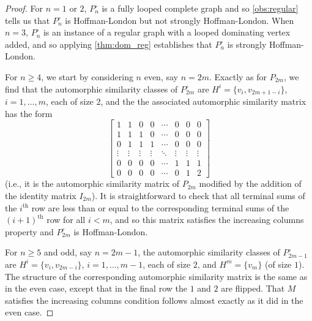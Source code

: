 \documentclass[11pt]{article}
\theoremstyle{definition}
\newcommand{\ith}[1]{$#1^{\text{th}}$}
\renewcommand{\loop}{\circ}
\begin{document}
\begin{proof}
For $n = 1$ or $2$, $P_n^\loop$ is a fully looped complete graph and so \cref{obs:regular} tells us that $P_n^\loop$ is Hoffman-London but not strongly Hoffman-London. When $n=3$, $P_n^\loop$ is an instance of a regular graph with a looped dominating vertex added, and so applying \cref{thm:dom_reg} establishes that $P_n^\loop$ is strongly Hoffman-London.

For $n \ge 4$, we start by considering $n$ even, say $n=2m$. Exactly as for $P_{2m}$, we find that the automorphic similarity classes of $P_{2m}^\circ$ are $H^i=\{v_i,v_{2m+1-i}\}$, $i=1, \ldots, m$, each of size $2$, and the the associated automorphic similarity matrix has the form 
\[ \begin{bmatrix}
1 & 1 & 0 & 0 & \cdots & 0 & 0 & 0\\
1 & 1 & 1 & 0 & \cdots & 0 & 0 & 0\\
0 & 1 & 1 & 1 & \cdots & 0 & 0 & 0\\
\vdots & \vdots & \vdots & \vdots & \ddots & \vdots & \vdots& \vdots\\
0 & 0 & 0 & 0 & \cdots & 1 & 1 & 1\\
0 & 0 & 0 & 0 & \cdots & 0 & 1 & 2
    \end{bmatrix} \]
(i.e., it is the automorphic similarity matrix of $P_{2m}$ modified by the addition of the identity matrix $I_{2m}$). It is straightforward to check that all terminal sums of the \ith{i} row are less than or equal to the corresponding terminal sums of the \ith{(i+1)} row for all $i < m$, and so this matrix satisfies the increasing columns property and $P_{2m}^\circ$ is Hoffman-London. 

For $n \ge 5$ and odd, say $n=2m-1$, the automorphic similarity classes of $P_{2m-1}^\loop$ are $H^i=\{v_i,v_{2m-i}\}$, $i=1, \ldots, m-1$, each of size $2$, and $H^m=\{v_m\}$ (of size $1$). The structure of the corresponding automorphic similarity matrix is the same as in the even case, except that in the final row the $1$ and $2$ are flipped. That $M$ satisfies the increasing columns condition follows almost exactly as it did in the even case.


\end{proof}
\end{document}
